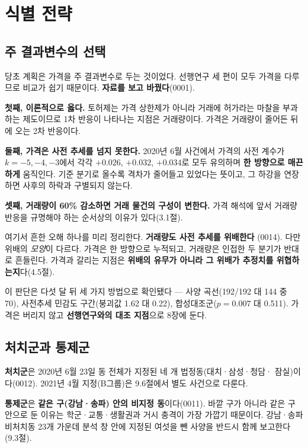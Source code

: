 
\section{식별 전략}

\subsection{주 결과변수의 선택}

당초 계획은 가격을 주 결과변수로 두는 것이었다. 선행연구 세 편이 모두 가격을
다루므로 비교가 쉽기 때문이다. \textbf{자료를 보고 바꿨다}(0001).

\textbf{첫째, 이론적으로 옳다.} 토허제는 가격 상한제가 아니라 거래에 허가라는
마찰을 부과하는 제도이므로 1차 반응이 나타나는 지점은 거래량이다. 가격은 거래량이
줄어든 뒤에 오는 2차 반응이다.

\textbf{둘째, 가격은 사전 추세를 넘지 못한다.} 2020년 6월 사건에서 가격의 사전
계수가 $k=-5, -4, -3$에서 각각 $+0.026$, $+0.032$, $+0.034$로 모두 유의하며
\textbf{한 방향으로 매끈하게} 움직인다. 기준 분기로 올수록 격차가 줄어들고
있었다는 뜻이고, 그 하강을 연장하면 사후의 하락과 구별되지 않는다.

\textbf{셋째, 거래량이 60\% 감소하면 거래 물건의 구성이 변한다.} 가격 해석에
앞서 거래량 반응을 규명해야 하는 순서상의 이유가 있다(3.1절).

여기서 흔한 오해 하나를 미리 정리한다. \textbf{거래량도 사전 추세를 위배한다}
(0014). 다만 위배의 \emph{모양}이 다르다. 가격은 한 방향으로 누적되고, 거래량은
인접한 두 분기가 반대로 흔들린다. 가격과 갈리는 지점은 \textbf{위배의 유무가
아니라 그 위배가 추정치를 위협하는지}다(4.5절).

이 판단은 다섯 달 뒤 세 가지 방법으로 확인됐다 --- 사양 곡선(192/192 대 144 중
70), 사전추세 민감도 구간(붕괴값 1.62 대 0.22), 합성대조군($p=0.007$ 대 0.511).
가격은 버리지 않고 \textbf{선행연구와의 대조 지점}으로 8장에 둔다.

\subsection{처치군과 통제군}

\textbf{처치군}은 2020년 6월 23일 동 전체가 지정된 네 개 법정동(대치·삼성·청담·
잠실)이다(0012). 2021년 4월 지정(B그룹)은 9.6절에서 별도 사건으로 다룬다.

\textbf{통제군}은 \textbf{같은 구(강남·송파) 안의 비지정 동}이다(0011). 바깥 구가
아니라 같은 구 안으로 둔 이유는 학군·교통·생활권과 거시 충격이 가장 가깝기
때문이다. 강남·송파 비처치동 23개 가운데 분석 창 안에 지정된 여섯을 뺀 사양을
반드시 함께 보고한다(9.3절).

